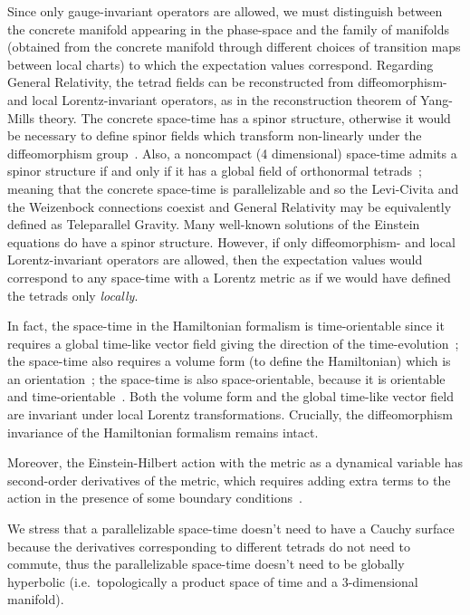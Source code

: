 \documentclass[11pt]{book}
\begin{document}
Since only gauge-invariant operators are allowed, we must distinguish
between the concrete manifold appearing in the phase-space and the
family of manifolds (obtained from the concrete manifold through
different choices of transition maps between local charts) to which the
expectation values correspond. Regarding General Relativity, the tetrad
fields can be reconstructed from diffeomorphism- and local
Lorentz-invariant
operators\cite{Fustero1985Einsteinux2019s}, as in the reconstruction theorem of
Yang-Mills theory\cite{Giles1981Reconstruction}. The concrete space-time has a spinor structure, otherwise it
would be necessary to define spinor fields which transform non-linearly
under the diffeomorphism
group~\cite{Pitts2012Nontriviality}.
Also, a noncompact (4 dimensional) space-time admits a spinor structure
if and only if it has a global field of orthonormal
tetrads~\cite{Geroch1968Spinor};
meaning that the concrete space-time is
parallelizable\cite{Geroch1968Spinor} and so the Levi-Civita and the Weizenbock connections
coexist\cite{Youssef2007Linear} and General Relativity may be equivalently defined as
Teleparallel
Gravity\cite{Aldrovandi2012Teleparallel}. Many well-known solutions of the Einstein equations do
have a spinor structure\cite{Geroch1968Spinor}. However, if only diffeomorphism- and local
Lorentz-invariant operators are allowed, then the expectation values
would correspond to any space-time with a Lorentz metric as if we would
have defined the tetrads only \emph{locally}.

In fact, the space-time in the Hamiltonian formalism is time-orientable
since it requires a global time-like vector field giving the direction
of the time-evolution~\cite{Geroch1979Global}; the space-time also requires a volume form
(to define the Hamiltonian) which is an
orientation~\cite{Guillemin2010Differential}; the space-time is also space-orientable, because it
is orientable and
time-orientable~\cite{Geroch1979Global}. Both the volume form and the global time-like vector
field are invariant under local Lorentz transformations. Crucially, the
diffeomorphism invariance of the Hamiltonian formalism remains intact.

Moreover, the Einstein-Hilbert action with the metric as a dynamical
variable has second-order derivatives of the metric, which requires
adding extra terms to the action in the presence of some boundary
conditions~\cite{Chakraborty2017Boundary}.

We stress that a parallelizable space-time doesn't need to have a Cauchy
surface because the derivatives corresponding to different tetrads do
not need to commute, thus the parallelizable space-time doesn't need to
be globally hyperbolic (i.e.~topologically a product space of time and a
3-dimensional
manifold)\cite{Dieckmann1988Cauchy}\cite{Geroch1970domain}\cite{Geroch1968Spinor}\cite{Geroch1970Spinor}.
\end{document}
